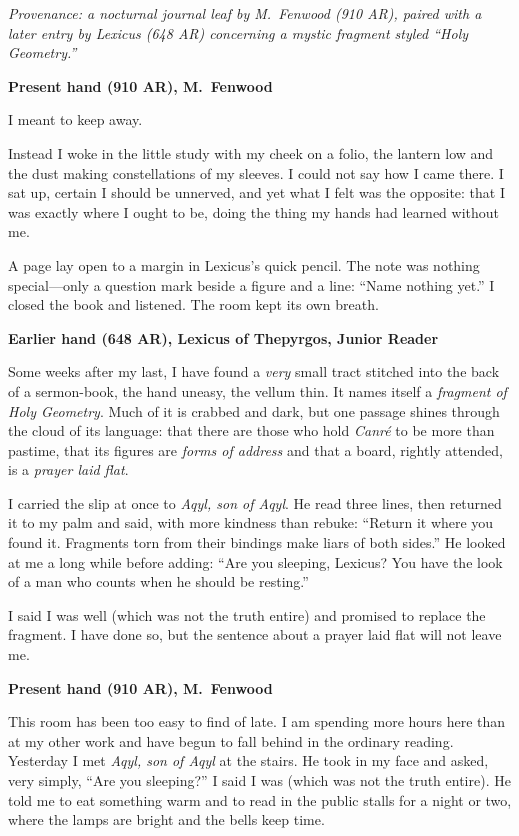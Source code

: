 \documentclass[11pt]{article}
\begin{document}
\noindent\textit{Provenance: a nocturnal journal leaf by M.\ Fenwood (910 AR), paired with a later entry by Lexicus (648 AR) concerning a mystic fragment styled ``Holy Geometry.''}

\medskip
\noindent\textbf{Present hand (910 AR), M.\ Fenwood}

I meant to keep away.

Instead I woke in the little study with my cheek on a folio, the lantern low and the dust making constellations of my sleeves. I could not say how I came there. I sat up, certain I should be unnerved, and yet what I felt was the opposite: that I was exactly where I ought to be, doing the thing my hands had learned without me.

A page lay open to a margin in Lexicus’s quick pencil. The note was nothing special—only a question mark beside a figure and a line: ``Name nothing yet.'' I closed the book and listened. The room kept its own breath.

\medskip
\noindent\textbf{Earlier hand (648 AR), Lexicus of Thepyrgos, Junior Reader}

Some weeks after my last, I have found a \emph{very} small tract stitched into the back of a sermon-book, the hand uneasy, the vellum thin. It names itself a \textit{fragment of Holy Geometry}. Much of it is crabbed and dark, but one passage shines through the cloud of its language: that there are those who hold \textit{Canr\'e} to be more than pastime, that its figures are \emph{forms of address} and that a board, rightly attended, is a \emph{prayer laid flat}.

I carried the slip at once to \textit{Aqyl, son of Aqyl}. He read three lines, then returned it to my palm and said, with more kindness than rebuke: ``Return it where you found it. Fragments torn from their bindings make liars of both sides.'' He looked at me a long while before adding: ``Are you sleeping, Lexicus? You have the look of a man who counts when he should be resting.''

I said I was well (which was not the truth entire) and promised to replace the fragment. I have done so, but the sentence about a prayer laid flat will not leave me.

\medskip
\noindent\textbf{Present hand (910 AR), M.\ Fenwood}

This room has been too easy to find of late. I am spending more hours here than at my other work and have begun to fall behind in the ordinary reading. Yesterday I met \textit{Aqyl, son of Aqyl} at the stairs. He took in my face and asked, very simply, ``Are you sleeping?'' I said I was (which was not the truth entire). He told me to eat something warm and to read in the public stalls for a night or two, where the lamps are bright and the bells keep time.
\end{document}
